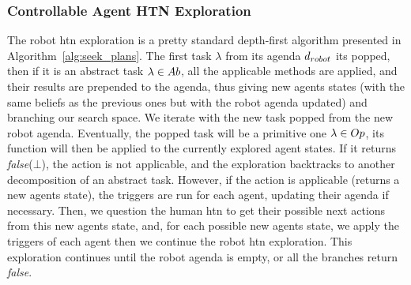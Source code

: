\documentclass[a4paper,11pt,twoside]{StyleThese}
\begin{document}
\subsubsection{Controllable Agent HTN Exploration}
The robot \acrshort{htn} exploration is a pretty standard depth-first algorithm presented in Algorithm~\ref{alg:seek_plans}. The first task $\lambda$ from its agenda $d_{robot}$ its popped, then if it is an abstract task $\lambda \in Ab$, all the applicable methods are applied, and their results are prepended to the agenda, thus giving new agents states (with the same beliefs as the previous ones but with the robot agenda updated) and branching our search space. We iterate with the new task popped from the new robot agenda. Eventually, the popped task will be a primitive one $\lambda \in Op$, its function will then be applied to the currently explored agent states. If it returns \textit{false}($\bot$), the action is not applicable, and the exploration backtracks to another decomposition of an abstract task. However, if the action is applicable (returns a new agents state), the triggers are run for each agent, updating their agenda if necessary. Then, we question the human \acrshort{htn} to get their possible next actions from this new agents state, and, for each possible new agents state, we apply the triggers of each agent then we continue the robot \acrshort{htn} exploration. This exploration continues until the robot agenda is empty, or all the branches return \textit{false}.
\end{document}

